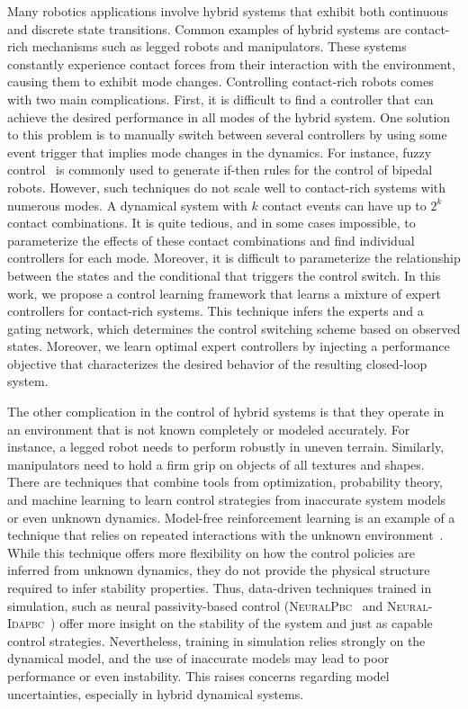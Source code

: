 

Many robotics applications involve hybrid systems that exhibit both continuous
and discrete state transitions. Common examples of hybrid systems are
contact-rich mechanisms such as legged robots and manipulators. These systems
constantly experience contact forces from their interaction with the
environment, causing them to exhibit mode changes. Controlling contact-rich
robots comes with two main complications. First, it is difficult to find a
controller that can achieve the desired performance in all modes of the hybrid
system.
%
One solution to this problem is to manually switch between several controllers
by using some event trigger that implies mode changes in the dynamics.
%
For instance, fuzzy control~\cite{kahraman2020fuzzy, katic2003survey} is
commonly used to generate if-then rules for the control of bipedal robots.
However, such techniques do not scale well to contact-rich systems with numerous
modes. A dynamical system with $k$ contact events can have up to $2^k$ contact
combinations. It is quite tedious, and in some cases impossible, to parameterize
the effects of these contact combinations and find individual controllers for
each mode. Moreover, it is difficult to parameterize the relationship between
the states and the conditional that triggers the control switch. 
%
In this work, we propose a control learning framework that learns a mixture of
expert controllers for contact-rich systems.
%
This technique infers the experts and a gating network, which determines the
control switching scheme based on observed states.
%
Moreover, we learn optimal expert controllers by injecting a performance
objective that characterizes the desired behavior of the resulting closed-loop
system.


The other complication in the control of hybrid systems is that they operate in
an environment that is not known completely or modeled accurately.
%
For instance, a legged robot needs to perform robustly in uneven terrain.
Similarly, manipulators need to hold a firm grip on objects of all textures and
shapes.
%
There are techniques that combine tools from optimization, probability theory,
and machine learning to learn control strategies from inaccurate system models
or even unknown dynamics.
%
Model-free reinforcement learning is an example of a technique that relies on
repeated interactions with the unknown
environment~\cite{heess2017emergence,andrychowicz2020learning,lillicrap2015continuous}.
%
While this technique offers more flexibility on how the control policies are
inferred from unknown dynamics, they do not provide the physical structure
required to infer stability properties.
%
Thus, data-driven techniques trained in simulation, such as neural
passivity-based control (\textsc{NeuralPbc}~\cite{neuralpbc} and
\textsc{Neural-Idapbc}~\cite{neuralidapbc}) offer more insight on the stability
of the system and just as capable control strategies.
%
Nevertheless, training in simulation relies strongly on the
dynamical model, and the use of inaccurate models may lead to poor performance
or even instability.
%
This raises concerns regarding model uncertainties, especially in hybrid dynamical
systems.
%

